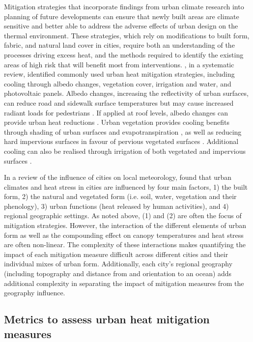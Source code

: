 \documentclass[final,3p,times,authoryear]{elsarticle}
\begin{document}
Mitigation strategies that incorporate findings from urban climate research into planning of future developments can ensure that newly built areas are climate sensitive and better able to address the adverse effects of urban design on the thermal environment. These strategies, which rely on modifications to built form, fabric, and natural land cover in cities, require both an understanding of the processes driving excess heat, and the methods required to identify the existing areas of high risk that will benefit most from interventions. \cite{Krayenhoff2021}, in a systematic review, identified commonly used urban heat mitigation strategies, including cooling through albedo changes, vegetation cover, irrigation and water, and photovoltaic panels. Albedo changes, increasing the reflectivity of urban surfaces, can reduce road and sidewalk surface temperatures but may cause increased radiant loads for pedestrians \citep{Middel2020}. If applied at roof levels, albedo changes can provide urban heat reductions \citep{Jacobs2018Roof}. Urban vegetation provides cooling benefits through shading of urban surfaces and evapotranspiration \citep{Bowler2010,Coutts2012,Coutts2015}, as well as reducing hard impervious surfaces in favour of pervious vegetated surfaces \citep{Middel2019a}. Additional cooling can also be realised through irrigation of both vegetated \citep{Broadbent2017a,Cheung2021} and impervious surfaces \citep{Hendel2016,Solcerova2018}.


In a review of the influence of cities on local meteorology, \cite{Masson2020a} found that urban climates and heat stress in cities are influenced by four main factors, 1) the built form, 2) the natural and vegetated form (i.e. soil, water, vegetation and their phenology), 3) urban functions (heat released by human activities), and 4) regional geographic settings. As noted above, (1) and (2) are often the focus of mitigation strategies. However, the interaction of the different elements of urban form as well as the compounding effect on canopy temperatures and heat stress are often non-linear. The complexity of these interactions makes quantifying the impact of each mitigation measure difficult across different cities and their individual mixes of urban form. Additionally, each city's regional geography (including topography and distance from and orientation to an ocean) adds additional complexity in separating the impact of mitigation measures from the geography influence. 

\subsection{Metrics to assess urban heat mitigation measures}
\end{document}
